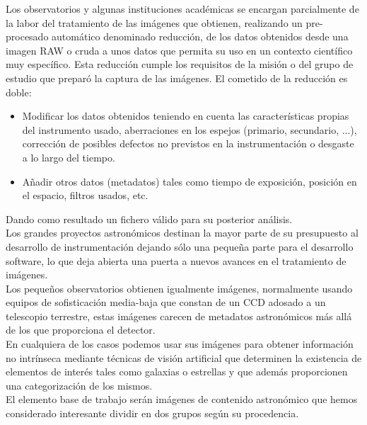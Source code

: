	Los observatorios y algunas instituciones académicas se encargan parcialmente de la labor del tratamiento de las imágenes que obtienen, realizando un pre-procesado automático denominado reducción, de los datos obtenidos desde una imagen RAW o cruda a unos datos que permita su uso en un contexto científico muy específico. Esta reducción cumple los requisitos de la misión o del grupo de estudio que preparó la captura de las imágenes. El cometido de la reducción es doble:
	\begin{itemize}
	\item Modificar los datos obtenidos teniendo en cuenta las características propias del instrumento usado, aberraciones en los espejos (primario, secundario, ...), corrección de posibles defectos no previstos en la instrumentación o desgaste a lo largo del tiempo.
	\item Añadir otros datos (metadatos) tales como tiempo de exposición, posición en el espacio, filtros usados, etc. 
	\end{itemize}
	Dando como resultado un fichero válido para su posterior análisis.
	\\
	Los grandes proyectos astronómicos destinan la mayor parte de su presupuesto al desarrollo de instrumentación dejando sólo una pequeña parte para el desarrollo software, lo que deja abierta una puerta a nuevos avances en el tratamiento de imágenes.\\
	Los pequeños observatorios obtienen igualmente imágenes, normalmente usando equipos de sofisticación media-baja que constan de un CCD adosado a un telescopio terrestre, estas imágenes carecen de metadatos astronómicos más allá de los que proporciona el detector.
	\\
	En cualquiera de los casos podemos usar sus imágenes para obtener información no intrínseca mediante técnicas de visión artificial que determinen la existencia de elementos de interés tales como galaxias o estrellas y que además proporcionen una categorización de los mismos.
	\\
	El elemento base de trabajo serán imágenes de contenido astronómico que hemos considerado interesante dividir en dos grupos según su procedencia. 
	
